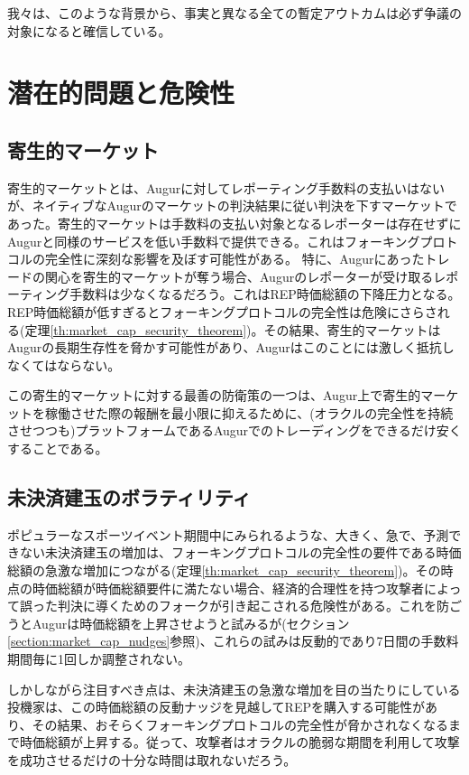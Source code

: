 \documentclass[floatfix,reprint,nofootinbib,amsmath,amssymb,epsfig,pre,floats,letterpaper,groupedaffiliation]{revtex4-1}
\theoremstyle{definition}
\theoremstyle{definition}
\theoremstyle{definition}
\begin{document}
我々は、このような背景から、事実と異なる全ての暫定アウトカムは必ず争議の対象になると確信している。

\section{潜在的問題と危険性}

\subsection{寄生的マーケット}
寄生的マーケットとは、Augurに対してレポーティング手数料の支払いはないが、ネイティブなAugurのマーケットの判決結果に従い判決を下すマーケットであった。寄生的マーケットは手数料の支払い対象となるレポーターは存在せずにAugurと同様のサービスを低い手数料で提供できる。これはフォーキングプロトコルの完全性に深刻な影響を及ぼす可能性がある。
特に、Augurにあったトレードの関心を寄生的マーケットが奪う場合、Augurのレポーターが受け取るレポーティング手数料は少なくなるだろう。これはREP時価総額の下降圧力となる。REP時価総額が低すぎるとフォーキングプロトコルの完全性は危険にさらされる(定理\ref{th:market_cap_security_theorem})。その結果、寄生的マーケットはAugurの長期生存性を脅かす可能性があり、Augurはこのことには激しく抵抗しなくてはならない。

この寄生的マーケットに対する最善の防衛策の一つは、Augur上で寄生的マーケットを稼働させた際の報酬を最小限に抑えるために、(オラクルの完全性を持続させつつも)プラットフォームであるAugurでのトレーディングをできるだけ安くすることである。

\subsection{未決済建玉のボラティリティ}
ポピュラーなスポーツイベント期間中にみられるような、大きく、急で、予測できない未決済建玉の増加は、フォーキングプロトコルの完全性の要件である時価総額の急激な増加につながる(定理\ref{th:market_cap_security_theorem})。その時点の時価総額が時価総額要件に満たない場合、経済的合理性を持つ攻撃者によって誤った判決に導くためのフォークが引き起こされる危険性がある。これを防ごうとAugurは時価総額を上昇させようと試みるが(セクション\ref{section:market_cap_nudges}参照)、これらの試みは反動的であり7日間の手数料期間毎に1回しか調整されない。

しかしながら注目すべき点は、未決済建玉の急激な増加を目の当たりにしている投機家は、この時価総額の反動ナッジを見越してREPを購入する可能性があり、その結果、おそらくフォーキングプロトコルの完全性が脅かされなくなるまで時価総額が上昇する。従って、攻撃者はオラクルの脆弱な期間を利用して攻撃を成功させるだけの十分な時間は取れないだろう。
\end{document}
